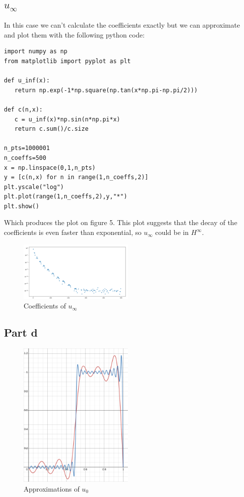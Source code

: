 \documentclass{article}
\begin{document}
\subsection{$u_\infty$}
In this case we can't calculate the coefficients exactly but we can approximate
and plot them with the following python code:
\begin{lstlisting}
import numpy as np
from matplotlib import pyplot as plt

def u_inf(x):
   return np.exp(-1*np.square(np.tan(x*np.pi-np.pi/2)))

def c(n,x):
   c = u_inf(x)*np.sin(n*np.pi*x)
   return c.sum()/c.size

n_pts=1000001
n_coeffs=500
x = np.linspace(0,1,n_pts)
y = [c(n,x) for n in range(1,n_coeffs,2)]
plt.yscale("log")
plt.plot(range(1,n_coeffs,2),y,"*")
plt.show()
\end{lstlisting}

Which produces the plot on figure 5.
This plot suggests that the decay of the coefficients is even faster than
exponential, so $u_\infty$ could be in $H^\infty$.

\begin{figure}[ht]
\caption{Coefficients of $u_\infty$}
\centering
\includegraphics[width=0.5\textwidth]{u_infCoeffs.png}
\end{figure}
\subsection{Part d}
\begin{figure}[ht]
\caption{Approximations of $u_0$}
\centering
\includegraphics[width=0.5\textwidth]{u_0Approx.png}
\end{figure}
\end{document}
